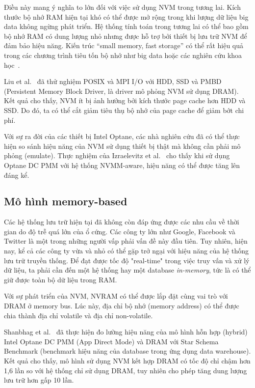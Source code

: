 Điều này mang ý nghĩa to lớn đối với việc sử dụng NVM trong tương lai. Kích
thước bộ nhớ RAM hiện tại khó có thể được mở rộng trong khi lượng dữ liệu big
data không ngừng phát triển. Hệ thống tính toán trong tương lai có thể bao gồm
bộ nhớ RAM có dung lượng nhỏ nhưng được hỗ trợ bởi thiết bị lưu trữ NVM để đảm
bảo hiệu năng. Kiến trúc ``small memory, fast storage'' có thể rất hiệu quả
trong các chương trình tiêu tốn bộ nhớ như big data hoặc các nghiên cứu khoa
học~\cite{bahnImplicationsNVMBased2020}.

Liu et al.~\cite{liuPerformanceEvaluationModeling2017} đã thử nghiệm POSIX và
MPI I/O với HDD, SSD và PMBD (Persistent Memory Block Driver, là driver mô phỏng
NVM sử dụng DRAM). Kết quả cho thấy, NVM ít bị ảnh hưởng bởi kích thước page
cache hơn HDD và SSD. Do đó, ta có thể cắt giảm tiêu thụ bộ nhớ của page cache
để giảm bớt chi phí.

Với sự ra đời của các thiết bị Intel Optane, các nhà nghiên cứu đã có thể thực
hiện so sánh hiệu năng của NVM sử dụng thiết bị thật mà không cần phải mô phỏng
(emulate). Thực nghiệm của Izraelevitz et
al.~\cite{izraelevitzBasicPerformanceMeasurements2019} cho thấy khi sử dụng
Optane DC PMM với hệ thống NVMM-aware, hiệu năng có thể được tăng lên đáng kể.

\subsection{Mô hình memory-based}
Các hệ thống lưu trữ hiện tại đã không còn đáp ứng được các nhu cầu về thời gian
do độ trễ quá lớn của ổ cứng. Các công ty lớn như Google, Facebook và Twitter là
một trong những người vấp phải vấn đề này đầu tiên. Tuy nhiên, hiện nay, kể cả
các công ty vừa và nhỏ có thể gặp trở ngại với hiệu năng của hệ thống lưu trữ
truyền thống. Để đạt được tốc độ "real-time" trong việc truy vấn và xử lý dữ
liệu, ta phải cần đến một hệ thống hay một database \textit{in-memory}, tức là
có thể giữ được toàn bộ dữ liệu trong RAM.

Với sự phát triển của NVM, NVRAM có thể được lắp đặt cùng vai trò với DRAM ở
memory bus. Lúc này, địa chỉ bộ nhớ (memory address) có thể được chia thành địa
chỉ volatile và địa chỉ non-volatile.

Shanbhag et al.~\cite{shanbhagLargescaleInmemoryAnalytics2020} đã
thực hiện đo lường hiệu năng của mô hình hỗn hợp (hybrid) Intel Optane DC PMM
(App Direct Mode) và DRAM với Star Schema Benchmark (benchmark hiệu năng của
database trong ứng dụng data warehouse). Kết quả cho thấy, mô hình sử dụng NVM
kết hợp DRAM có tốc độ chỉ chậm hơn 1,6 lần so với hệ thống chỉ sử dụng DRAM,
tuy nhiên cho phép tăng dung lượng lưu trữ hơn gấp 10 lần.

